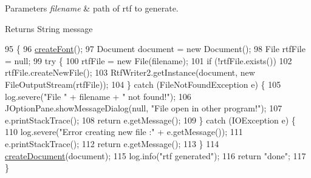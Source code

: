\begin{DoxyParams}{Parameters}
{\em filename} & path of rtf to generate. \\
\hline
\end{DoxyParams}
\begin{DoxyReturn}{Returns}
String message 
\end{DoxyReturn}

\begin{DoxyCode}
95                                              \{
96         \hyperlink{classit_1_1isislab_1_1masonassisteddocumentation_1_1mason_1_1control_1_1_pdf_rtf_generator_af1f9a21f995c47a9e1a5a6f276c97852}{createFont}();
97         Document document = \textcolor{keyword}{new} Document();
98         File rtfFile = null;
99         \textcolor{keywordflow}{try} \{
100             rtfFile = \textcolor{keyword}{new} File(filename);
101             \textcolor{keywordflow}{if} (!rtfFile.exists())
102                 rtfFile.createNewFile();
103             RtfWriter2.getInstance(document, \textcolor{keyword}{new} FileOutputStream(rtfFile));
104         \} \textcolor{keywordflow}{catch} (FileNotFoundException e) \{
105             log.severe(\textcolor{stringliteral}{"File "} + filename + \textcolor{stringliteral}{" not found!"});
106             JOptionPane.showMessageDialog(null, \textcolor{stringliteral}{"File open in other program!"});
107             e.printStackTrace();
108             \textcolor{keywordflow}{return} e.getMessage();
109         \} \textcolor{keywordflow}{catch} (IOException e) \{
110             log.severe(\textcolor{stringliteral}{"Error creating new file :"} + e.getMessage());
111             e.printStackTrace();
112             \textcolor{keywordflow}{return} e.getMessage();
113         \}
114         \hyperlink{classit_1_1isislab_1_1masonassisteddocumentation_1_1mason_1_1control_1_1_pdf_rtf_generator_add23c0e308cdf54a3c1e3a8128ea29ed}{createDocument}(document);
115         log.info(\textcolor{stringliteral}{"rtf generated"});
116         \textcolor{keywordflow}{return} \textcolor{stringliteral}{"done"};
117     \}
\end{DoxyCode}


